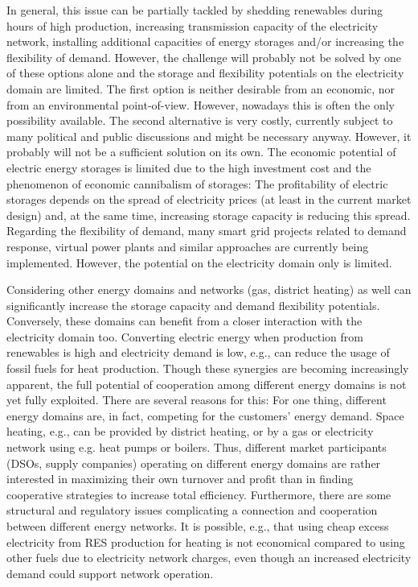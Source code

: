 \documentclass[review]{elsarticle}
\begin{document}
In general, this issue can be partially tackled by shedding
renewables during hours of high production, increasing
transmission capacity of the electricity network, installing
additional capacities of energy storages and/or increasing the
flexibility of demand.
However, the challenge will probably not be solved by one of these
options alone and the storage and flexibility potentials on the
electricity domain are limited. 
The first option is neither desirable from an
economic, nor from an environmental point-of-view. However, nowadays
this is often the only possibility available. The second alternative
is very costly, currently subject to many political and public
discussions and might be necessary anyway. However, it probably will
not be a sufficient solution on its own. The economic potential of
electric energy storages is limited due to the high investment cost
and the phenomenon of economic cannibalism of storages: The
profitability of electric storages depends on the spread of
electricity prices (at least in the current market design) and, at
the same time, increasing storage capacity
is reducing this spread. Regarding the flexibility of demand, many
smart grid projects related to demand response, virtual power plants
and similar approaches are currently being implemented. However, the
potential on the electricity domain only is limited. 

Considering other energy domains and networks (gas, district
heating) as well can significantly increase the storage capacity and
demand flexibility potentials. Conversely, these domains can benefit
from a closer interaction with the electricity domain too. Converting
electric energy when production from renewables is high and
electricity demand is low, e.g., can reduce the usage of
fossil fuels for heat production. Though these synergies are becoming
increasingly apparent, the full potential of cooperation among
different energy domains is not yet fully exploited. There are
several reasons for this: For one thing, different energy domains are,
in fact, competing for the customers’ energy demand. Space heating, e.g.,
can be provided by district heating,  or by a gas or electricity network
using e.g. heat pumps or boilers. Thus, different market
participants (DSOs, supply companies) operating on different energy
domains are rather interested in maximizing their own turnover and
profit than in finding cooperative strategies to increase total
efficiency. Furthermore, there are some structural and regulatory
issues complicating a connection and cooperation between different
energy networks. It is possible, e.g., that using cheap excess
electricity from RES production for heating is not economical compared
to using other fuels due to electricity network charges, even though
an increased electricity demand could support network operation.
\end{document}
